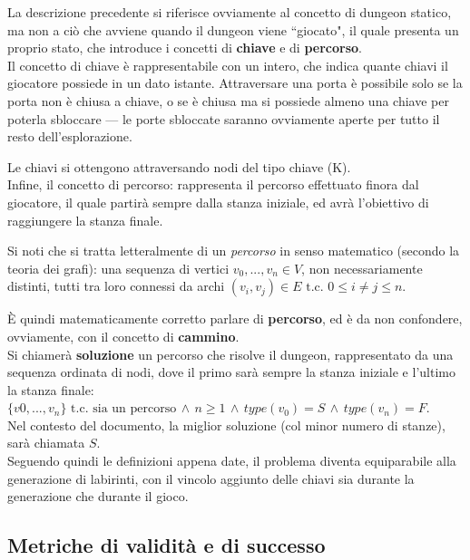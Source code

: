 \documentclass[12pt,titlepage]{article}
\begin{document}
\noindent La descrizione precedente si riferisce ovviamente al concetto di dungeon statico, ma non a ciò che avviene quando il dungeon viene ``giocato", il quale presenta un proprio stato, che introduce i concetti di \textbf{chiave} e di \textbf{percorso}.\\

\noindent Il concetto di chiave è rappresentabile con un intero, che indica quante chiavi il giocatore possiede in un dato istante. Attraversare una porta è possibile solo se la porta non è chiusa a chiave, o se è chiusa ma si possiede almeno una chiave per poterla sbloccare --- le porte sbloccate saranno ovviamente aperte per tutto il resto dell'esplorazione.

Le chiavi si ottengono attraversando nodi del tipo chiave (K).\\

\noindent Infine, il concetto di percorso: rappresenta il percorso effettuato finora dal giocatore, il quale partirà sempre dalla stanza iniziale, ed avrà l'obiettivo di raggiungere la stanza finale.

Si noti che si tratta letteralmente di un \textit{percorso} in senso matematico (secondo la teoria dei grafi): una sequenza di vertici $v_0, ..., v_n \in V$, non necessariamente distinti, tutti tra loro connessi da archi $(v_i, v_j) \in E \text{ t.c. } 0 \leq i \neq j \leq n$.

È quindi matematicamente corretto parlare di \textbf{percorso}, ed è da non confondere, ovviamente, con il concetto di \textbf{cammino}.\\

\noindent Si chiamerà \textbf{soluzione} un percorso che risolve il dungeon, rappresentato da una sequenza ordinata di nodi, dove il primo sarà sempre la stanza iniziale e l'ultimo la stanza finale:\\
$\{v0, ..., v_n\} \text{ t.c. } \text{sia un percorso} \, \land \, n \geq 1 \, \land \, type(v_0) = S \, \land \, type(v_n) = F$.\\
Nel contesto del documento, la miglior soluzione (col minor numero di stanze), sarà chiamata $S$.\\

\noindent Seguendo quindi le definizioni appena date, il problema diventa equiparabile alla generazione di labirinti, con il vincolo aggiunto delle chiavi sia durante la generazione che durante il gioco.

\subsection {Metriche di validità e di successo}
\end{document}
